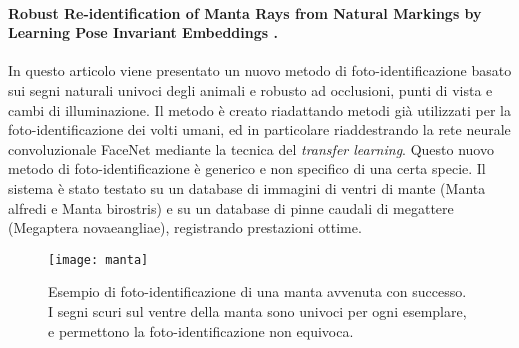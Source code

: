 \paragraph*{Robust Re-identification of Manta Rays from Natural Markings by Learning Pose Invariant Embeddings \cite{manta}.}
In questo articolo viene presentato un nuovo metodo di foto-identificazione basato sui segni naturali univoci degli animali e robusto ad occlusioni, punti di vista e cambi di illuminazione. Il metodo è creato riadattando metodi già utilizzati per la foto-identificazione dei volti umani, ed in particolare riaddestrando la rete neurale convoluzionale FaceNet \cite{facenet} mediante la tecnica del \textit{transfer learning}. Questo nuovo metodo di foto-identificazione è generico e non specifico di una certa specie.
Il sistema è stato testato su un database di immagini di ventri di mante (Manta alfredi e Manta birostris) e su un database di pinne caudali di megattere (Megaptera novaeangliae), registrando prestazioni ottime.

\begin{figure}[h!]
\centering
\texttt{[image: manta]}
\caption{Esempio di foto-identificazione di una manta avvenuta con successo. I segni scuri sul ventre della manta sono univoci per ogni esemplare, e permettono la foto-identificazione non equivoca.}
\label{fig:manta}
\end{figure}